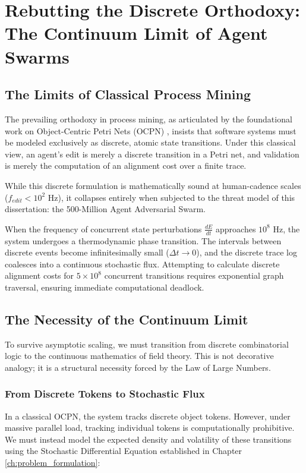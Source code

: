 \chapter{Rebutting the Discrete Orthodoxy: The Continuum Limit of Agent Swarms}
\label{ch:rebuttal}

\section{The Limits of Classical Process Mining}

The prevailing orthodoxy in process mining, as articulated by the foundational work on Object-Centric Petri Nets (OCPN) \cite{noYYYY42}, insists that software systems must be modeled exclusively as discrete, atomic state transitions. Under this classical view, an agent's edit is merely a discrete transition in a Petri net, and validation is merely the computation of an alignment cost over a finite trace.

While this discrete formulation is mathematically sound at human-cadence scales ($f_{edit} < 10^2$ Hz), it collapses entirely when subjected to the threat model of this dissertation: the 500-Million Agent Adversarial Swarm. 

When the frequency of concurrent state perturbations $\frac{dE}{dt}$ approaches $10^8$ Hz, the system undergoes a thermodynamic phase transition. The intervals between discrete events become infinitesimally small ($\Delta t \to 0$), and the discrete trace log coalesces into a continuous stochastic flux. Attempting to calculate discrete alignment costs for $5 \times 10^8$ concurrent transitions requires exponential graph traversal, ensuring immediate computational deadlock.

\section{The Necessity of the Continuum Limit}

To survive asymptotic scaling, we must transition from discrete combinatorial logic to the continuous mathematics of field theory. This is not decorative analogy; it is a structural necessity forced by the Law of Large Numbers. 

\subsection{From Discrete Tokens to Stochastic Flux}
In a classical OCPN, the system tracks discrete object tokens. However, under massive parallel load, tracking individual tokens is computationally prohibitive. We must instead model the expected density and volatility of these transitions using the Stochastic Differential Equation established in Chapter \ref{ch:problem_formulation}:

